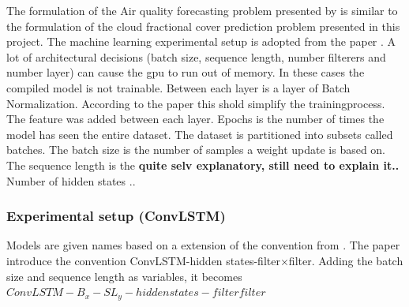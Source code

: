The formulation of the Air quality forecasting problem presented by  \citeauthor{SunAirLSTM} is similar to the formulation of the cloud fractional cover prediction problem presented in this project. The machine learning experimental setup is adopted from the paper . 
A lot of architectural decisions (batch size, sequence length, number filterers and number layer) can cause the \acrshort{gpu} to run out of memory. In these cases the compiled model is not trainable. Between each layer is a layer of Batch Normalization. According to the paper  this shold simplify the trainingprocess. The feature was added between each layer. Epochs is the number of times the model has seen the entire dataset. The dataset is partitioned into subsets called batches. The batch size is the number of samples a weight update is based on. The sequence length is the \textbf{quite selv explanatory, still need to explain it.. } Number of hidden states .. 

\subsubsection{Experimental setup (ConvLSTM)}
Models are given names based on a extension of the convention from . The paper introduce the convention ConvLSTM-hidden states-filter$\times$filter. Adding the batch size and sequence length as variables, it becomes $ConvLSTM-B_{x}-SL_{y}-hidden states-filter$\times$filter$

\begin{table}[]
    \centering
    \caption{Give three examples to simplify the explanation of configurations and models.}
    \label{tab:convlstm_config}
\end{table}


